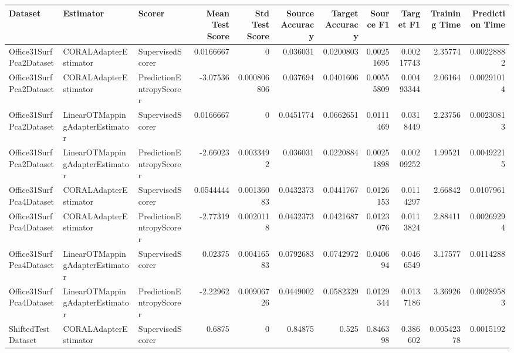 \begin{tabular}{lllrrrrrrrr}
\hline
 Dataset                 & Estimator                       & Scorer                  &   Mean Test Score &   Std Test Score &   Source Accuracy &   Target Accuracy &   Source F1 &   Target F1 &   Training Time &   Prediction Time \\
\hline
 Office31SurfPca2Dataset & CORALAdapterEstimator           & SupervisedScorer        &         0.0166667 &      0           &         0.036031  &         0.0200803 &  0.00251695 &  0.00217743 &      2.35774    &        0.00228882 \\
 Office31SurfPca2Dataset & CORALAdapterEstimator           & PredictionEntropyScorer &        -3.07536   &      0.000806806 &         0.037694  &         0.0401606 &  0.00555809 &  0.00493344 &      2.06164    &        0.00291014 \\
 Office31SurfPca2Dataset & LinearOTMappingAdapterEstimator & SupervisedScorer        &         0.0166667 &      0           &         0.0451774 &         0.0662651 &  0.0111469  &  0.0318449  &      2.23756    &        0.00230813 \\
 Office31SurfPca2Dataset & LinearOTMappingAdapterEstimator & PredictionEntropyScorer &        -2.66023   &      0.0033492   &         0.036031  &         0.0220884 &  0.00251898 &  0.00209252 &      1.99521    &        0.00492215 \\
 Office31SurfPca4Dataset & CORALAdapterEstimator           & SupervisedScorer        &         0.0544444 &      0.00136083  &         0.0432373 &         0.0441767 &  0.0126153  &  0.0114297  &      2.66842    &        0.0107961  \\
 Office31SurfPca4Dataset & CORALAdapterEstimator           & PredictionEntropyScorer &        -2.77319   &      0.0020118   &         0.0432373 &         0.0421687 &  0.0123076  &  0.0113824  &      2.88411    &        0.00269294 \\
 Office31SurfPca4Dataset & LinearOTMappingAdapterEstimator & SupervisedScorer        &         0.02375   &      0.00416583  &         0.0792683 &         0.0742972 &  0.040694   &  0.0466549  &      3.17577    &        0.0114288  \\
 Office31SurfPca4Dataset & LinearOTMappingAdapterEstimator & PredictionEntropyScorer &        -2.22962   &      0.00906726  &         0.0449002 &         0.0582329 &  0.0129344  &  0.0137186  &      3.36926    &        0.00289583 \\
 ShiftedTestDataset      & CORALAdapterEstimator           & SupervisedScorer        &         0.6875    &      0           &         0.84875   &         0.525     &  0.846398   &  0.386602   &      0.00542378 &        0.0015192  \\

\end{tabular}
